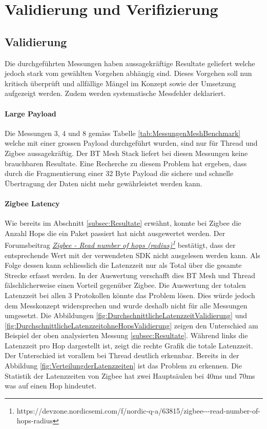\clearpage
\section{Validierung und Verifizierung}\label{sec:ValidierungVerifizierung}

\subsection{Validierung}\label{subsec:Validierung}
Die durchgeführten Messungen haben aussagekräftige Resultate geliefert welche jedoch stark vom gewählten Vorgehen abhängig sind.
Dieses Vorgehen soll nun kritisch überprüft und allfällige Mängel im Konzept sowie der Umsetzung aufgezeigt werden.
Zudem werden systematische Messfehler deklariert.

\paragraph{Large Payload}
Die Messungen 3, 4 und 8 gemäss Tabelle \ref{tab:MessungenMeshBenchmark} welche mit einer grossen Payload durchgeführt wurden, sind nur für Thread und Zigbee aussagekräftig. Der BT Mesh Stack liefert bei diesen Messungen keine brauchbaren Resultate.
Eine Recherche zu diesem Problem hat ergeben, dass durch die Fragmentierung einer 32 Byte Payload die sichere und schnelle Übertragung der Daten nicht mehr gewährleistet werden kann.

\paragraph{Zigbee Latency}
Wie bereits im Abschnitt \ref{subsec:Resultate} erwähnt, konnte bei Zigbee die Anzahl Hops die ein Paket passiert hat nicht ausgewertet werden.
Der Forumsbeitrag \href{https://devzone.nordicsemi.com/f/nordic-q-a/63815/zigbee---read-number-of-hops-radius}{\textit{Zigbee - Read number of hops (radius)\footnote{\url{https://devzone.nordicsemi.com/f/nordic-q-a/63815/zigbee---read-number-of-hops-radius}}}} bestätigt, dass der entsprechende Wert mit der verwendeten SDK nicht ausgelesen werden kann.
Als Folge dessen kann schliesslich die Latenzzeit nur als Total über die gesamte Strecke erfasst werden. In der Auswertung verschafft dies BT Mesh und Thread fälschlicherweise einen Vorteil gegenüber Zigbee.
Die Auswertung der totalen Latenzzeit bei allen 3 Protokollen könnte das Problem lösen.
Dies würde jedoch dem Messkonzept widersprechen und wurde deshalb nicht für alle Messungen umgesetzt.
Die Abbildungen \ref{fig:DurchschnittlicheLatenzzeitValidierung} und \ref{fig:DurchschnittlicheLatenzzeitohneHopsValidierung} zeigen den Unterschied am Beispiel der oben analysierten Messung \ref{subsec:Resultate}.
Während links die Latenzzeit pro Hop dargestellt ist, zeigt die rechte Grafik die totale Latenzzeit.
Der Unterschied ist vorallem bei Thread deutlich erkennbar.
Bereits in der Abbildung \ref{fig:VerteilungderLatenzzeiten} ist das Problem zu erkennen.
Die Statistik der Latenzzeiten von Zigbee hat zwei Hauptsäulen bei 40ms und 70ms was auf einen Hop hindeutet.


